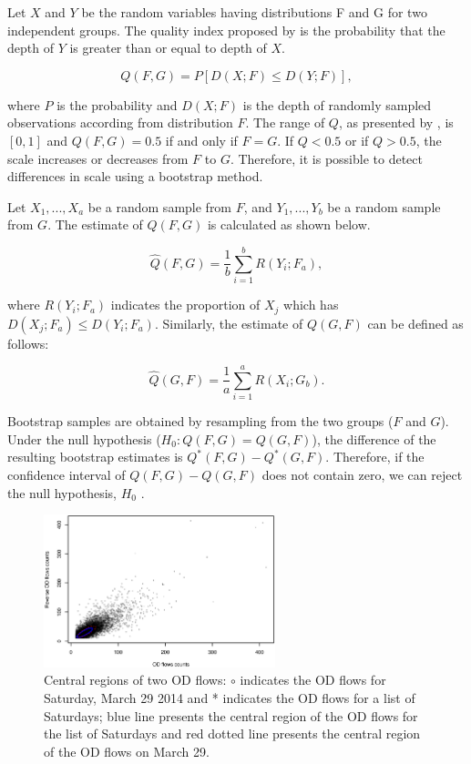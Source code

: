 \documentclass[a4paper,UKenglish]{lipics-v2018}
\begin{document}
Let $X$ and $Y$ be the random variables having distributions F and G for two independent groups.
The quality index proposed by \cite{liu93JASA} is the probability that the depth of $Y$ is greater than or equal to depth of $X$. 

\begin{equation*}
Q(F,G) = P[D(X;F) \leq D(Y;F)],
\end{equation*}

where $P$ is the probability and $D(X;F)$ is the depth of randomly sampled observations according from distribution $F$.
The range of $Q$, as presented by \cite{liu93JASA}, is $[0,1]$ and $Q(F,G) = 0.5$ if and only if $F = G$. If $Q < 0.5$  or if $Q > 0.5$, the scale increases or decreases from  $F$ to $G$.
Therefore, it is possible to detect differences in scale using a bootstrap method.

Let $X_1,...,X_a$ be a random sample from $F$, and $Y_1,...,Y_b$ be a random sample from $G$.
The estimate of $Q(F,G)$ is calculated as shown below.

\begin{equation*}
\hat{Q}(F,G) =\frac{1}{b} \sum_{i=1}^{b} R(Y_i;F_a),
\end{equation*}

where $R(Y_i;F_a)$ indicates the proportion of $X_j$ which has $D(X_j;F_a) \leq D(Y_i;F_a)$.
Similarly, the estimate of $Q(G,F)$ can be defined as follows:

\begin{equation*}
\hat{Q}(G,F) =\frac{1}{a} \sum_{i=1}^{a} R(X_i;G_b).
\end{equation*}

Bootstrap samples are obtained by resampling from the two groups ($F$ and $G$).
Under the null hypothesis ($H_0: Q(F,G) = Q(G,F)$), the difference of the resulting bootstrap estimates is $Q^*(F,G) - Q^*(G,F)$.
Therefore, if the confidence interval of $Q(F,G) - Q(G,F)$ does not contain zero, we can reject the null hypothesis, $H_0$ \cite{liu93JASA,wilcox03MBR}.

\begin{figure}
	\centering
	\includegraphics[width=0.6\textwidth]{images/com_mar_0329.eps}
	\caption{Central regions of two OD flows: $\circ$ indicates the OD flows for Saturday, March 29 2014 and * indicates the OD flows for a list of Saturdays; blue line presents the central region of the OD flows for the list of Saturdays and red dotted line presents the central region of the OD flows on March 29.}
	\label{fig:com_mar_0329}	
\end{figure}
\end{document}
